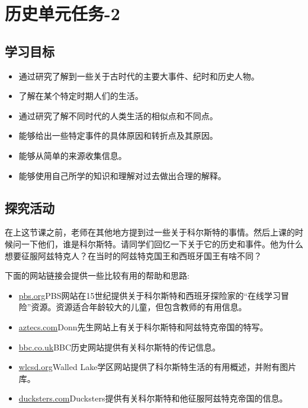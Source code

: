 \chapter{历史单元任务-2}


\section{学习目标}
     \begin{itemize}
      \item 通过研究了解到一些关于古时代的主要大事件、纪时和历史人物。
      \item 了解在某个特定时期人们的生活。
      \item 通过研究了解不同时代的人类生活的相似点和不同点。
      \item 能够给出一些特定事件的具体原因和转折点及其原因。
      \item 能够从简单的来源收集信息。
      \item 能够使用自己所学的知识和理解对过去做出合理的解释。
    \end{itemize}


\section{探究活动}
   在上这节课之前，老师在其他地方提到过一些关于科尔斯特的事情。然后上课的时候问一下他们，谁是科尔斯特。请同学们回忆一下关于它的历史和事件。他为什么想要征服阿兹特克人？在当时的阿兹特克国王和西班牙国王有啥不同？\par
   下面的网站链接会提供一些比较有用的帮助和思路:\par
   \begin{itemize}
     \item  \href{http://www.pbs.org/program/retired-site/}{pbs.org}PBS网站在15世纪提供关于科尔斯特和西班牙探险家的“在线学习冒险”资源。资源适合年龄较大的儿童，但包含教师的有用信息。
     \item  \href{https://aztecs.mrdonn.org/spanish-arrival.html}{aztecs.com}Donn先生网站上有关于科尔斯特和阿兹特克帝国的特写。
     \item  \href{http://www.bbc.co.uk/history/historic_figures/cortes_hernan.shtml}{bbc.co.uk}BBC历史网站提供有关科尔斯特的传记信息。
     \item  \href{http://www.wlcsd.org/loonlake.cfm?subpage=1471242}{wlcsd.org}Walled Lake学区网站提供了科尔斯特生活的有用概述，并附有图片库。
     \item  \href{https://www.ducksters.com/history/aztec_empire/spanish_conquest.php}{ducksters.com}Ducksters提供有关科尔斯特和他征服阿兹特克帝国的信息。
   \end{itemize}  

